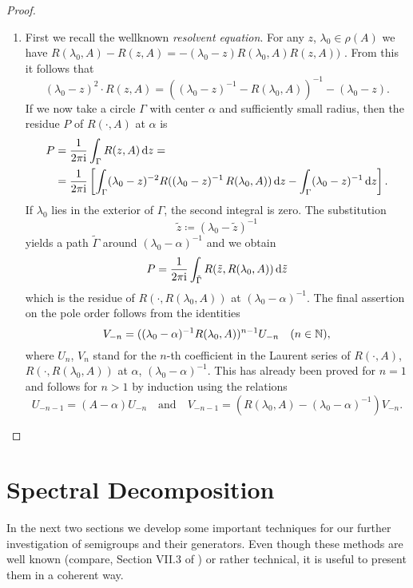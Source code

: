 \begin{proof}
\begin{enumerate}[\upshape (i), wide, labelindent=.5em]
\item 
First we recall the wellknown \emph{resolvent equation}. For any $z$,  $\lambda_{0} \in \rho(A)$ we have $R(\lambda_{0},A) - R(z,A)= -(\lambda_{0}-z)R(\lambda_{0},A)R(z,A))$ . From this it follows that 
%
\[
	(\lambda_{0}-z)^2\cdot R(z,A) = \left((\lambda_{0}-z)^{-1}-R(\lambda_{0},A)\right)^{-1} - (\lambda_{0}-z).
\]
%
If we now take a circle $\Gamma$ with center $\alpha$ and sufficiently small radius, then the residue $P$ of $R(\cdot,A)$ at $\alpha$ is
\begin{align*}
P &=  \frac{1}{2\pi\mathrm{i} } \int_{\Gamma} R(z,A)   \mathop{}\!\mathrm{d}{z} = \\
&=  \frac{1}{2\pi\mathrm{i} } \left[\int_{\Gamma} (\lambda_{0}-z)^{-2}R((\lambda_{0}-z)^{-1}\,R(\lambda_{0},A))  \mathop{}\!\mathrm{d}{z}   - 
   \int_{\Gamma}(\lambda_{0}-z)^{-1} \mathop{}\!\mathrm{d}{z} \right] . 
\end{align*}
If $\lambda_{0}$ lies in the exterior of $\Gamma$, the second integral is zero.
The substitution 
%
\[
	 \tilde{z} \coloneqq (\lambda_{0} - \tilde{z})^{-1} 
\]
%
yields a path $\tilde{\Gamma}$ around $(\lambda_{0}-\alpha)^{-1}$ and we obtain
\[
P = \frac{1}{2\pi\mathrm{i} } \int_{\tilde{\Gamma}} R(\tilde{z},R(\lambda_{0},A)) \, \mathrm{d}\tilde{z}
\]
which is the residue of $R(\cdot,R(\lambda_{0},A))$ at $(\lambda_{0}-\alpha)^{-1}$.
The final assertion on the pole order follows from the identities
\[
V_{-n} = ((\lambda_{0}-\alpha)^{-1}R(\lambda_{0},A))^{n-1}U_{-n} \quad (n \in \mathbb{N}) ,
\]
where $U_{n}$, \resp $V_{n}$ stand for the $ n $-th coefficient in the Laurent series of $R(\cdot,A)$, \resp $R(\cdot,R(\lambda_{0},A))$ at $\alpha$, \resp $(\lambda_{0}-\alpha)^{-1}$.
This has already been proved for $n = 1$ and follows for $n > 1$ by induction using the relations
\[
U_{-n-1} = (A - \alpha)U_{-n} 
\quad \text{and} \quad 
V_{-n-1} = \left(R(\lambda_{0},A) - (\lambda_{0}-\alpha)^{-1}\right)V_{-n} .
\]
\end{enumerate}
\end{proof}
\section{Spectral Decomposition}\label{sec:a3-3}%
In the next two sections we develop some important techniques for our further investigation of semigroups and their generators.
Even though these methods are well known (compare, \eg Section VII.3 of \citet{dunfordschwartz:1958}) or rather technical, it is useful to present them in a coherent way.

